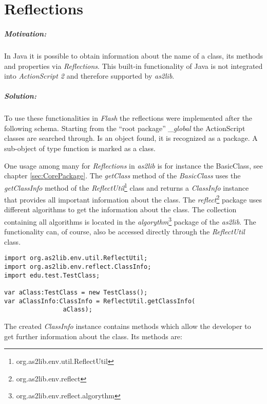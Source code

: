 \chapter{Reflections}
\label{sec:Reflections}

\paragraph{Motivation:}

In Java it is possible to obtain information about the name of a class, its methods and properties via \emph{Reflections}. This built-in functionality of Java is not integrated into {\sl ActionScript 2} and therefore supported by {\sl as2lib}.

\paragraph{Solution:}
To use these functionalities in {\sl Flash} the reflections were implemented after the following schema.
Starting from the "`root package"' \emph{\_global} the ActionScript classes are searched through. Is an object found, it is recognized as a package. A sub-object of type function is marked as a class. 


One usage among many for \emph{Reflections} in {\sl as2lib} is for instance the BasicClass, see chapter \ref{sec:CorePackage}. The \emph{getClass} method of the \emph{BasicClass} uses the \emph{getClassInfo} method of the \emph{ReflectUtil}\footnote{org.as2lib.env.util.ReflectUtil} class and returns a \emph{ClassInfo} instance that provides all important information about the class. The \emph{reflect}\footnote{org.as2lib.env.reflect} package uses different algorithms to get the information about the class. The collection containing all algorithms is located in the \emph{algorythm}\footnote{org.as2lib.env.reflect.algorythm} package of the \emph{as2lib}. The functionality can, of course, also be accessed directly through the \emph{ReflectUtil} class.
\begin{lstlisting}[frame=single]
import org.as2lib.env.util.ReflectUtil;
import org.as2lib.env.reflect.ClassInfo;
import edu.test.TestClass;

var aClass:TestClass = new TestClass();
var aClassInfo:ClassInfo = ReflectUtil.getClassInfo(
				aClass);
\end{lstlisting}
The created \emph{ClassInfo} instance contains methods which allow the developer to get further information about the class.
Its methods are:

